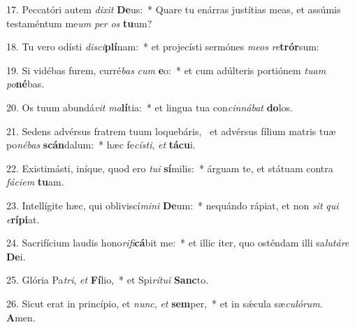 17. Peccatóri autem \textit{di}\textit{xit} \textbf{De}us:~*  Quare tu enárras justítias meas, et assúmis testaméntum me\textit{um} \textit{per} \textit{os} \textbf{tu}um?\

18. Tu vero odísti \textit{di}\textit{sci}\textbf{plí}nam:~*  et projecísti sermónes \textit{me}\textit{os} \textit{re}\textbf{trór}sum:\

19. Si vidébas furem, curré\textit{bas} \textit{cum} \textbf{e}o:~*  et cum adúlteris portiónem \textit{tu}\textit{am} \textit{po}\textbf{né}bas.\

20. Os tuum abundá\textit{vit} \textit{ma}\textbf{lí}tia:~*  et lingua tua con\textit{cin}\textit{ná}\textit{bat} \textbf{do}los.\

21. Sedens advérsus fratrem tuum loquebáris, \dag\  et advérsus fílium matris tuæ po\textit{né}\textit{bas} \textbf{scán}dalum:~*  hæc fe\textit{cís}\textit{ti}, \textit{et} \textbf{tá}\textbf{cu}i.\

22. Existimásti, iníque, quod ero \textit{tu}\textit{i} \textbf{sí}milis:~*  árguam te, et státuam contra \textit{fá}\textit{ci}\textit{em} \textbf{tu}am.\

23. Intellígite hæc, qui obliviscí\textit{mi}\textit{ni} \textbf{De}um:~*  nequándo rápiat, et non \textit{sit} \textit{qui} \textit{e}\textbf{rí}\textbf{pi}at.\

24. Sacrifícium laudis hono\textit{ri}\textit{fi}\textbf{cá}bit me:~*  et illic iter, quo osténdam illi sa\textit{lu}\textit{tá}\textit{re} \textbf{De}i.\

25. Glória Pa\textit{tri}, \textit{et} \textbf{Fí}lio,~*  et Spi\textit{rí}\textit{tu}\textit{i} \textbf{Sanc}to.\

26. Sicut erat in princípio, et \textit{nunc}, \textit{et} \textbf{sem}per,~*  et in sǽcula sæ\textit{cu}\textit{ló}\textit{rum}. \textbf{A}men.\

